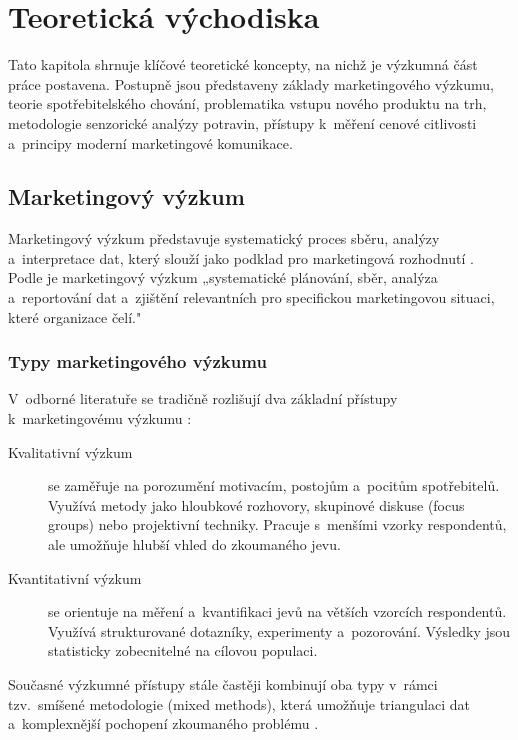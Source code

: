 \chapter{Teoretická východiska}
\label{chap:theory}

Tato kapitola shrnuje klíčové teoretické koncepty, na nichž je výzkumná část práce postavena. Postupně jsou představeny základy marketingového výzkumu, teorie spotřebitelského chování, problematika vstupu nového produktu na trh, metodologie senzorické analýzy potravin, přístupy k~měření cenové citlivosti a~principy moderní marketingové komunikace.

\section{Marketingový výzkum}
\label{sec:theory_mr}

Marketingový výzkum představuje systematický proces sběru, analýzy a~interpretace dat, který slouží jako podklad pro marketingová rozhodnutí \parencite{malhotra_2019}. Podle \textcite[s.~121]{kotler_keller_2016} je marketingový výzkum „systematické plánování, sběr, analýza a~reportování dat a~zjištění relevantních pro specifickou marketingovou situaci, které organizace čelí."

\subsection{Typy marketingového výzkumu}

V~odborné literatuře se tradičně rozlišují dva základní přístupy k~marketingovému výzkumu \parencite{kozel_2006, foret_2012}:

\begin{description}
  \item[Kvalitativní výzkum] se zaměřuje na porozumění motivacím, postojům a~pocitům spotřebitelů. Využívá metody jako hloubkové rozhovory, skupinové diskuse (focus groups) nebo projektivní techniky. Pracuje s~menšími vzorky respondentů, ale umožňuje hlubší vhled do zkoumaného jevu.
  \item[Kvantitativní výzkum] se orientuje na měření a~kvantifikaci jevů na větších vzorcích respondentů. Využívá strukturované dotazníky, experimenty a~pozorování. Výsledky jsou statisticky zobecnitelné na cílovou populaci.
\end{description}

Současné výzkumné přístupy stále častěji kombinují oba typy v~rámci tzv.\ smíšené metodologie (mixed methods), která umožňuje triangulaci dat a~komplexnější pochopení zkoumaného problému \parencite{creswell_2018}.

